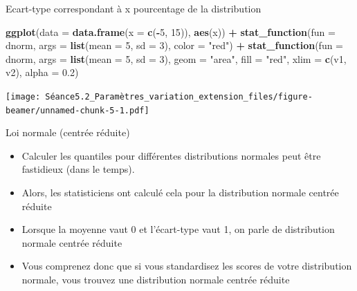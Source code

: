 \documentclass[ignorenonframetext,]{beamer}
\newenvironment{Shaded}{\begin{snugshade}}{\end{snugshade}}
\newcommand{\KeywordTok}[1]{\textcolor[rgb]{0.13,0.29,0.53}{\textbf{#1}}}
\newcommand{\DataTypeTok}[1]{\textcolor[rgb]{0.13,0.29,0.53}{#1}}
\newcommand{\DecValTok}[1]{\textcolor[rgb]{0.00,0.00,0.81}{#1}}
\newcommand{\FloatTok}[1]{\textcolor[rgb]{0.00,0.00,0.81}{#1}}
\newcommand{\StringTok}[1]{\textcolor[rgb]{0.31,0.60,0.02}{#1}}
\newcommand{\OperatorTok}[1]{\textcolor[rgb]{0.81,0.36,0.00}{\textbf{#1}}}
\newcommand{\NormalTok}[1]{#1}
\providecommand{\tightlist}{%
  \setlength{\itemsep}{0pt}\setlength{\parskip}{0pt}}
\begin{document}
\begin{frame}[fragile]{Ecart-type correspondant à x pourcentage de la
distribution}

\begin{Shaded}
\begin{Highlighting}[]
\KeywordTok{ggplot}\NormalTok{(}\DataTypeTok{data =} \KeywordTok{data.frame}\NormalTok{(}\DataTypeTok{x =} \KeywordTok{c}\NormalTok{(}\OperatorTok{-}\DecValTok{5}\NormalTok{, }\DecValTok{15}\NormalTok{)), }\KeywordTok{aes}\NormalTok{(x)) }\OperatorTok{+}
\StringTok{  }\KeywordTok{stat_function}\NormalTok{(}\DataTypeTok{fun =}\NormalTok{ dnorm, }\DataTypeTok{args =} \KeywordTok{list}\NormalTok{(}\DataTypeTok{mean =} \DecValTok{5}\NormalTok{, }\DataTypeTok{sd =} \DecValTok{3}\NormalTok{), }\DataTypeTok{color =} \StringTok{"red"}\NormalTok{) }\OperatorTok{+}
\StringTok{  }\KeywordTok{stat_function}\NormalTok{(}\DataTypeTok{fun =}\NormalTok{ dnorm, }\DataTypeTok{args =} \KeywordTok{list}\NormalTok{(}\DataTypeTok{mean =} \DecValTok{5}\NormalTok{, }\DataTypeTok{sd =} \DecValTok{3}\NormalTok{),}
                \DataTypeTok{geom =} \StringTok{"area"}\NormalTok{, }\DataTypeTok{fill =} \StringTok{"red"}\NormalTok{, }\DataTypeTok{xlim =} \KeywordTok{c}\NormalTok{(v1, v2), }\DataTypeTok{alpha =} \FloatTok{0.2}\NormalTok{)}
\end{Highlighting}
\end{Shaded}

\texttt{[image: Séance5.2\_Paramètres\_variation\_extension\_files/figure-beamer/unnamed-chunk-5-1.pdf]}

\end{frame}

\begin{frame}{Loi normale (centrée réduite)}

\begin{itemize}
\tightlist
\item
  Calculer les quantiles pour différentes distributions normales peut
  être fastidieux (dans le temps).
\item
  Alors, les statisticiens ont calculé cela pour la distribution normale
  centrée réduite
\item
  Lorsque la moyenne vaut 0 et l'écart-type vaut 1, on parle de
  distribution normale centrée réduite
\item
  Vous comprenez donc que si vous standardisez les scores de votre
  distribution normale, vous trouvez une distribution normale centrée
  réduite
\end{itemize}

\end{frame}
\end{document}
